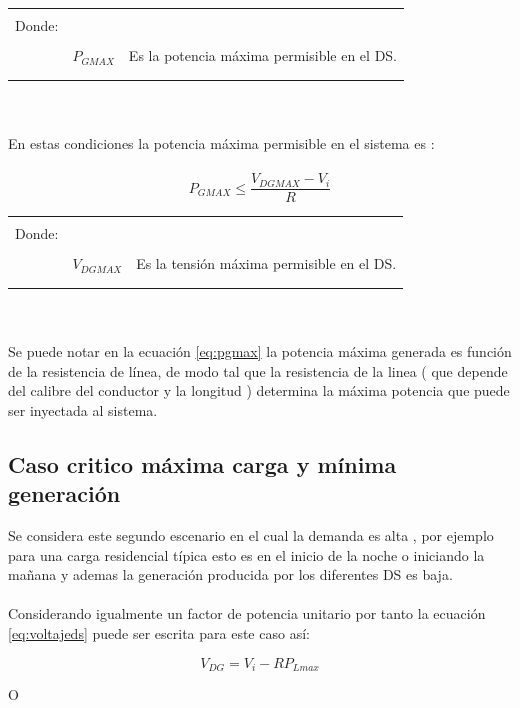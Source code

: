 \documentclass[12pt, letterpaper]{report}
\begin{document}
\begin{tabular}{l c r}
    & &\\
    Donde:& & \\
    & &\\
    & $P_{GMAX}$ & Es la potencia máxima permisible en el \ac{DS}.\\
    & &\\
    & &\\
\end{tabular}\\\\
En estas condiciones la potencia máxima permisible en el sistema es :\\\\
\begin{equation}
P_{GMAX} \leq \frac{V_{DGMAX} - V_{i}}{R}
\label{eq:pgmax}
\end{equation}
\begin{tabular}{l c r}
    & &\\
    Donde:& & \\
    & &\\
    & $V_{DGMAX}$ & Es la tensión máxima permisible en el \ac{DS}.\\
    & &\\
    & &\\
\end{tabular}\\\\
Se puede notar en la ecuación \ref{eq:pgmax} la potencia máxima generada es función de la resistencia de línea, de modo tal que la resistencia de la linea ( que depende del calibre del conductor y la longitud ) determina la máxima potencia que puede ser inyectada al sistema.\\
\subsection{Caso critico máxima carga y mínima generación }
Se considera este segundo escenario en el cual la demanda es alta , por ejemplo  para una carga residencial típica  esto es  en el inicio de la noche o iniciando la mañana y ademas la generación producida por los diferentes \ac{DS} es baja.\\\\
Considerando igualmente un factor de potencia unitario por tanto la ecuación \ref{eq:voltajeds} puede ser  escrita para este caso así:

\[V_{DG} = V_{i} - RP_{Lmax}\]

O
\end{document}

